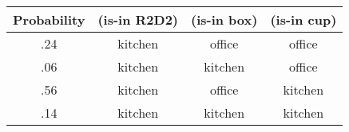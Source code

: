 \small
\begin{tabular}{cccc}
\hline
Probability & (is-in R2D2)  & (is-in box)  & (is-in cup) \\
\hline
.24 & kitchen & office & office \\
.06 & kitchen & kitchen & office \\
.56 & kitchen & office & kitchen \\
.14 & kitchen & kitchen & kitchen \\
\hline
\end{tabular}
\normalsize












